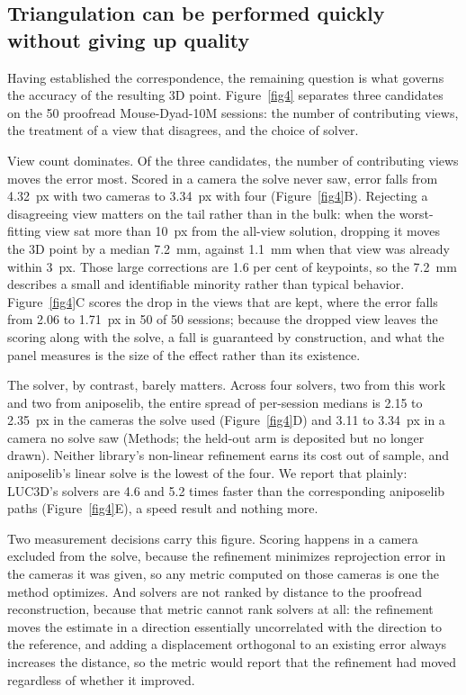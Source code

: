 \documentclass[pdflatex, sn-nature]{sn-jnl}
\theoremstyle{thmstyleone}%
\theoremstyle{thmstyletwo}%
\theoremstyle{thmstylethree}%
\begin{document}
\subsection{Triangulation can be performed quickly without giving up quality}\label{subsec2-4}

Having established the correspondence, the remaining question is what governs the accuracy of the resulting 3D point. Figure~\ref{fig4} separates three candidates on the 50 proofread Mouse-Dyad-10M sessions: the number of contributing views, the treatment of a view that disagrees, and the choice of solver.

View count dominates. Of the three candidates, the number of contributing views moves the error most. Scored in a camera the solve never saw, error falls from 4.32~px with two cameras to 3.34~px with four (Figure~\ref{fig4}B). Rejecting a disagreeing view matters on the tail rather than in the bulk: when the worst-fitting view sat more than 10~px from the all-view solution, dropping it moves the 3D point by a median 7.2~mm, against 1.1~mm when that view was already within 3~px. Those large corrections are 1.6 per cent of keypoints, so the 7.2~mm describes a small and identifiable minority rather than typical behavior. Figure~\ref{fig4}C scores the drop in the views that are kept, where the error falls from 2.06 to 1.71~px in 50 of 50 sessions; because the dropped view leaves the scoring along with the solve, a fall is guaranteed by construction, and what the panel measures is the size of the effect rather than its existence.

The solver, by contrast, barely matters. Across four solvers, two from this work and two from aniposelib, the entire spread of per-session medians is 2.15 to 2.35~px in the cameras the solve used (Figure~\ref{fig4}D) and 3.11 to 3.34~px in a camera no solve saw (Methods; the held-out arm is deposited but no longer drawn). Neither library's non-linear refinement earns its cost out of sample, and aniposelib's linear solve is the lowest of the four. We report that plainly: LUC3D's solvers are 4.6 and 5.2 times faster than the corresponding aniposelib paths (Figure~\ref{fig4}E), a speed result and nothing more.

Two measurement decisions carry this figure. Scoring happens in a camera excluded from the solve, because the refinement minimizes reprojection error in the cameras it was given, so any metric computed on those cameras is one the method optimizes. And solvers are not ranked by distance to the proofread reconstruction, because that metric cannot rank solvers at all: the refinement moves the estimate in a direction essentially uncorrelated with the direction to the reference, and adding a displacement orthogonal to an existing error always increases the distance, so the metric would report that the refinement had moved regardless of whether it improved.
\end{document}
